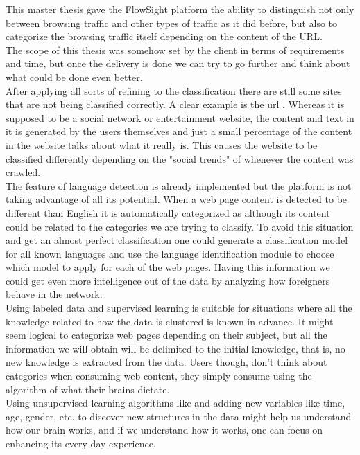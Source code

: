 This master thesis gave the FlowSight platform the ability to distinguish not only between browsing traffic and other types of traffic as it did before, but also to categorize the browsing traffic 
itself depending on the content of the URL. \\

The scope of this thesis was somehow set by the client in terms of requirements and time, but once the delivery is done we can try to go further and think about what could be done even better.\\
After applying all sorts of refining to the classification there are still some sites that are not being classified correctly. A clear example is the url . Whereas it is supposed to be
a social network or entertainment website, the content and text in it is generated by the users themselves and just a small percentage of the content in the website talks about what it really is.
This causes the website to be classified differently depending on the "social trends" of whenever the content was crawled.\\
The feature of language detection is already implemented but the platform is not taking advantage of all its potential. When a web page content is detected to be different than English it is automatically
categorized as  although its content could be related to the categories we are trying to classify. To avoid this situation and get an almost perfect classification one could generate a 
classification model for all known languages and use the language identification module to choose which model to apply for each of the web pages. Having this information we could get even more intelligence
out of the data by analyzing how foreigners behave in the network.\\
Using labeled data and supervised learning is suitable for situations where all the knowledge related to how the data is clustered is known in advance. It might seem logical to categorize web pages
depending on their subject, but all the information we will obtain will be delimited to the initial knowledge, that is, no new knowledge is extracted from the data. Users though, don't think about
categories when consuming web content, they simply consume using the algorithm of what their brains dictate.\\
Using unsupervised learning algorithms like  and adding new variables like 
time, age, gender, etc. to discover new structures in the data might help us understand how our brain works, and if we understand how it works, one can focus on enhancing its every day experience.

